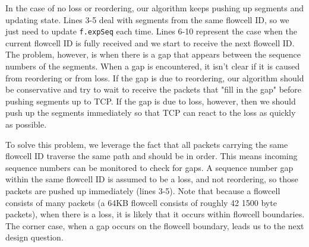 In the case of no loss or reordering, our algorithm keeps pushing up segments and updating state. Lines 3-5
deal with segments from the same flowcell ID, so we just need to update {\tt f.expSeq} each time. Lines 
6-10 represent the case when the current flowcell ID is fully received and we start to receive the
next flowcell ID. The problem, however, is when there is 
a gap that appears between the sequence numbers of the segments. When a gap is encountered,
it isn't clear if it is caused from reordering or from loss. If the gap is due to reordering,
our algorithm should be conservative and try to wait to receive the packets that "fill in the gap" 
before pushing segments up to TCP. If the gap is due to loss, however, then we should push up the 
segments immediately so that TCP can react to the loss as quickly as possible.

To solve this problem, we leverage the fact that all packets carrying the same flowcell ID traverse the 
same path and should be in order.
This means incoming sequence numbers can be monitored to check for
gaps. A sequence number gap within the same flowcell ID is assumed to be a loss, and not reordering,
so those packets are pushed up immediately (lines 3-5).
Note that because a flowcell consists of many packets (a 64KB flowcell consists
of roughly 42 1500 byte packets), when there is a loss, it is likely that it occurs within flowcell boundaries. 
The corner case, when a gap occurs on the flowcell boundary, leads us to the next design question.

